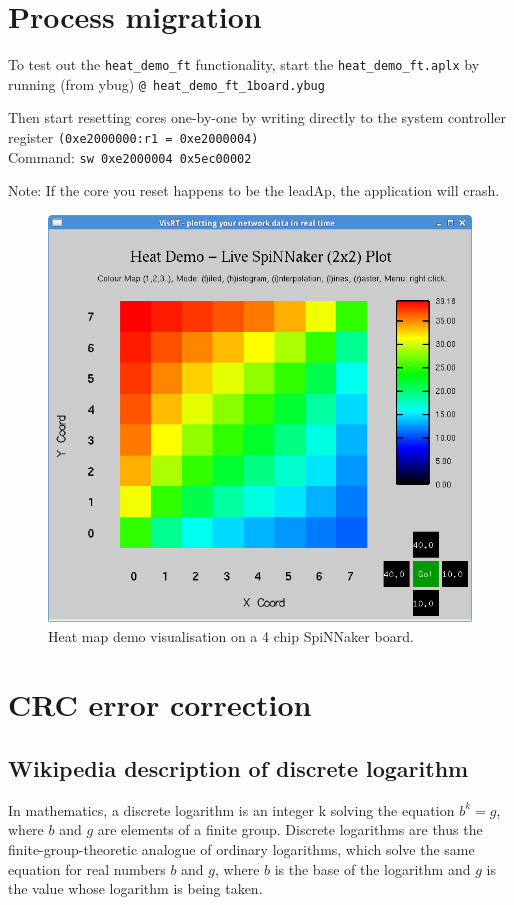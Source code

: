 \documentclass[oneside, a4paper, 11pt]{memoir}
\begin{document}


\newpage
\chapter{Process migration}

To test out the \verb|heat_demo_ft| functionality, start the \verb|heat_demo_ft.aplx|
by running (from ybug) \verb|@ heat_demo_ft_1board.ybug|

Then start resetting cores one-by-one by writing directly to the system
controller register \verb|(0xe2000000:r1 = 0xe2000004)|\\
Command: \verb|sw 0xe2000004 0x5ec00002|

Note: If the core you reset happens to be the leadAp, the application will
crash.

\begin{figure}[htbp]
	\centering
	\includegraphics[width=0.6\linewidth]{images/heatmap2x2.png}
	\caption{Heat map demo visualisation on a 4 chip SpiNNaker board.}	
\end{figure}


\newpage
\chapter{CRC error correction}

\section{Wikipedia description of discrete logarithm}
In mathematics, a discrete logarithm is an integer k solving the equation $b^k = g$, where $b$ and $g$ are elements of a finite group. Discrete logarithms are thus the finite-group-theoretic analogue of ordinary logarithms, which solve the same equation for real numbers $b$ and $g$, where $b$ is the base of the logarithm and $g$ is the value whose logarithm is being taken.
\end{document}
